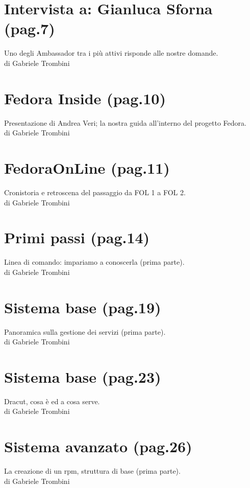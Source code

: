 \begin{titlepage}
\section*{\color[cmyk]{1, 0.57, 0, 0.38}Intervista a: Gianluca Sforna {\scriptsize(pag.7)}} \label{sec:Terza}
Uno degli Ambassador tra i più attivi risponde alle nostre domande.\\ {\tiny di Gabriele Trombini}
\section*{\color[cmyk]{1, 0.57, 0, 0.38}Fedora Inside {\scriptsize(pag.10)}} \label{sec:Quarta}
Presentazione di Andrea Veri; la nostra guida all'interno del progetto Fedora.\\  {\tiny di Gabriele Trombini}
\section*{\color[cmyk]{1, 0.57, 0, 0.38}FedoraOnLine {\scriptsize(pag.11)}} \label{sec:Quinta}
Cronistoria e retroscena del passaggio da FOL 1 a FOL 2.\\ {\tiny di Gabriele Trombini}
\section*{\color[cmyk]{1, 0.57, 0, 0.38}Primi passi {\scriptsize(pag.14)}} \label{sec:Sesta}
Linea di comando: impariamo a conoscerla (prima parte).\\ {\tiny di Gabriele Trombini}
\section*{\color[cmyk]{1, 0.57, 0, 0.38}Sistema base {\scriptsize(pag.19)}} \label{sec:Settima}
Panoramica sulla gestione dei servizi (prima parte).\\ {\tiny di Gabriele Trombini}
\section*{\color[cmyk]{1, 0.57, 0, 0.38}Sistema base {\scriptsize(pag.23)}} \label{sec:Ottava}
Dracut, cosa è ed a cosa serve.\\ {\tiny di Gabriele Trombini}
\section*{\color[cmyk]{1, 0.57, 0, 0.38}Sistema avanzato {\scriptsize(pag.26)}} \label{sec:Nona}
La creazione di un rpm, struttura di base (prima parte).\\ {\tiny di Gabriele Trombini}

\end{titlepage}
